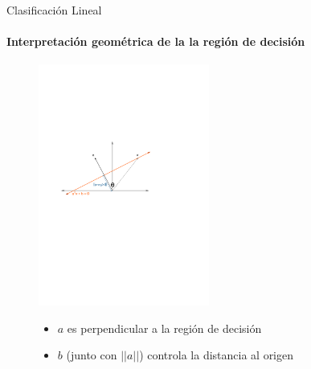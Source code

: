 \documentclass[9pt, handout]{beamer}
\begin{document}
\begin{frame}{Clasificación Lineal}
\framesubtitle{Interpretación geométrica de la la región de decisión}

\begin{figure}[h]
    \centering
    \includegraphics[width=0.5\textwidth]{../../img/cap3_proy.pdf}
    \vspace{2em}
    \begin{itemize}
      \item $a$ es perpendicular a la región de decisión
      \item $b$ (junto con $||a||$) controla la distancia al origen
    \end{itemize}

\end{figure}


\end{frame}
\end{document}
